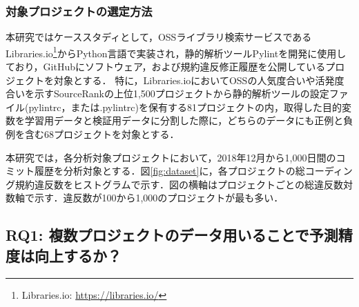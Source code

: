 \documentclass[submit,noauthor,ses,dvipdfmx]{ipsj}
\begin{document}
\subsubsection{対象プロジェクトの選定方法}
本研究ではケーススタディとして，OSSライブラリ検索サービスであるLibraries.io\footnote{Libraries.io: \url{https://libraries.io/}}からPython言語で実装され，静的解析ツールPylintを開発に使用しており，GitHubにソフトウェア，および規約違反修正履歴を公開しているプロジェクトを対象とする．
特に，Libraries.ioにおいてOSSの人気度合いや活発度合いを示すSourceRankの上位1,500プロジェクトから静的解析ツールの設定ファイル(pylintrc，または.pylintrc)を保有する81プロジェクトの内，取得した目的変数を学習用データと検証用データに分割した際に，どちらのデータにも正例と負例を含む68プロジェクトを対象とする．

本研究では，各分析対象プロジェクトにおいて，2018年12月から1,000日間のコミット履歴を分析対象とする．図\ref{fig:dataset}に，各プロジェクトの総コーディング規約違反数をヒストグラムで示す．図の横軸はプロジェクトごとの総違反数対数軸で示す．違反数が100から1,000のプロジェクトが最も多い．





\subsection{RQ1: 複数プロジェクトのデータ用いることで予測精度は向上するか？}
\end{document}

